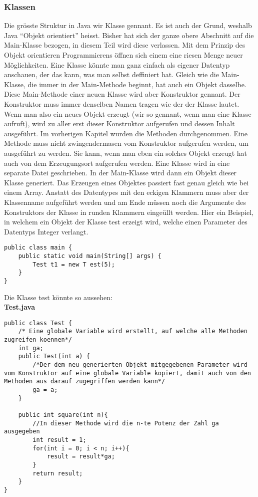 \subsubsection{Klassen}
Die grösste Struktur in Java wir Klasse gennant. Es ist auch der Grund, weshalb Java "`Objekt orientiert"' heisst. Bisher hat sich der ganze obere Abschnitt auf die Main-Klasse bezogen, in diesem Teil wird diese verlassen. Mit dem Prinzip des Objekt orientieren Programmierens öffnen sich einem eine riesen Menge neuer Möglichkeiten. Eine Klasse könnte man ganz einfach als eigener Datentyp anschauen, der das kann, was man selbst deffiniert hat. Gleich wie die Main-Klasse, die immer in der Main-Methode beginnt, hat auch ein Objekt dasselbe. Diese Main-Methode einer neuen Klasse wird aber Konstruktor gennant. Der Konstruktor muss immer denselben Namen tragen wie der der Klasse lautet. Wenn man also ein neues Objekt erzeugt (wir so gennant, wenn man eine Klasse aufruft), wird zu aller erst dieser Konstruktor aufgerufen und dessen Inhalt ausgeführt. Im vorherigen Kapitel wurden die Methoden durchgenommen. Eine Methode muss nicht zwingendermasen vom Konstruktor aufgerufen werden, um ausgeführt zu werden. Sie kann, wenn man eben ein solches Objekt erzeugt hat auch von dem Erzeugungsort aufgerufen werden. Eine Klasse wird in eine separate Datei geschrieben. In der Main-Klasse wird dann ein Objekt dieser Klasse generiert. Das Erzeugen eines Objektes passiert fast genau gleich wie bei einem Array. Anstatt des Datentypes mit den eckigen Klammern muss aber der Klassenname aufgeführt werden und am Ende müssen noch die Argumente des Konstruktors der Klasse in runden Klammern eingeüllt werden. Hier ein Beispiel, in welchem ein Objekt der Klasse test erzeigt wird, welche einen Parameter des Datentyps Integer verlangt.
\begin{lstlisting}
public class main {
	public static void main(String[] args) {
		Test t1 = new T	est(5);
	}
}
\end{lstlisting}
Die Klasse test könnte so aussehen: \\
\textbf{Test.java}
\begin{lstlisting}
public class Test {
	/* Eine globale Variable wird erstellt, auf welche alle Methoden zugreifen koennen*/
	int ga;
	public Test(int a) {
		/*Der dem neu generierten Objekt mitgegebenen Parameter wird vom Konstruktor auf eine globale Variable kopiert, damit auch von den Methoden aus darauf zugegriffen werden kann*/
		ga = a;
	}
	
	public int square(int n){
		//In dieser Methode wird die n-te Potenz der Zahl ga ausgegeben
		int result = 1;
		for(int i = 0; i < n; i++){
			result = result*ga;
		}
		return result;
	}
}
\end{lstlisting}
